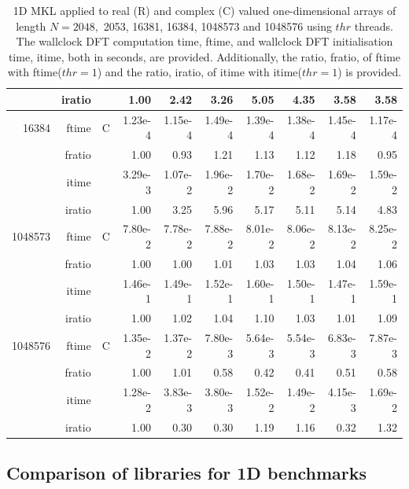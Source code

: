 \documentclass[a4paper]{article}
\begin{document}
\begin{table}
\begin{center}
\begin{tabular}{|r|r|r|r|r|r|r|r|r|r|}
     & iratio & &    1.00 &   2.42 &   3.26 &   5.05 &   4.35 &   3.58 &   3.58  \\ \hline
 16384  & ftime & C &  1.23e-4 &   1.15e-4 &   1.49e-4 &   1.39e-4 &   1.38e-4 &   1.45e-4 &   1.17e-4   \\ 
      & fratio & & 1.00 &   0.93 &   1.21 &   1.13 &   1.12 &   1.18 &   0.95  \\
     & itime & &  3.29e-3 &   1.07e-2 &   1.96e-2 &   1.70e-2 &   1.68e-2 &   1.69e-2 &   1.59e-2   \\ 
 & iratio & & 1.00 &   3.25 &   5.96 &   5.17 &   5.11 &   5.14 &   4.83   \\  \hline 
  1048573  & ftime & C &  7.80e-2 &   7.78e-2 &   7.88e-2 &   8.01e-2 &   8.06e-2 &   8.13e-2 &   8.25e-2      \\ 
      & fratio & &  1.00 &   1.00 &   1.01 &   1.03 &   1.03 &   1.04 &   1.06    \\ 
     & itime & &   1.46e-1 &   1.49e-1 &   1.52e-1 &   1.60e-1 &   1.50e-1 &   1.47e-1 &   1.59e-1   \\ 
     & iratio & &    1.00 &   1.02 &   1.04 &   1.10 &   1.03 &   1.01 &   1.09    \\ \hline 
 1048576  & ftime & C &  1.35e-2 &   1.37e-2 &   7.80e-3 &   5.64e-3 &   5.54e-3 &   6.83e-3 &   7.87e-3   \\ 
      & fratio & &  1.00 &   1.01 &   0.58 &   0.42 &   0.41 &   0.51 &   0.58  \\
     & itime & &  1.28e-2 &   3.83e-3 &   3.80e-3 &   1.52e-2 &   1.49e-2 &   4.15e-3 &   1.69e-2   \\ 
 & iratio & &  1.00 &   0.30 &   0.30 &   1.19 &   1.16 &   0.32 &   1.32 
  \\  \hline 
\end{tabular}
\caption{1D MKL applied to real (R) and complex (C) valued one-dimensional arrays of length $N=2048,$ 2053, 16381, 16384, 1048573 and 1048576  using $thr$ threads. The wallclock DFT computation time, ftime, and wallclock DFT initialisation time, itime, both in seconds, are provided. Additionally,  the ratio, fratio, of ftime  with ftime($thr=1$) and the ratio, iratio, of itime  with itime($thr=1$) is provided. }\label{Tbl:MKL1d}
\end{center}
\end{table}



\subsection{Comparison of libraries for 1D benchmarks}\label{Sec:1DComp}
\end{document}
